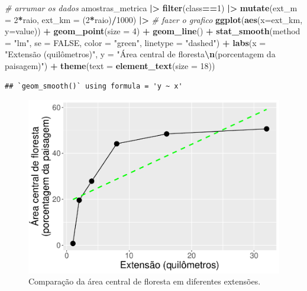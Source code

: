 \documentclass[
]{article}
\newenvironment{Shaded}{\begin{snugshade}}{\end{snugshade}}
\newcommand{\AttributeTok}[1]{\textcolor[rgb]{0.13,0.29,0.53}{#1}}
\newcommand{\CommentTok}[1]{\textcolor[rgb]{0.56,0.35,0.01}{\textit{#1}}}
\newcommand{\ConstantTok}[1]{\textcolor[rgb]{0.56,0.35,0.01}{#1}}
\newcommand{\DecValTok}[1]{\textcolor[rgb]{0.00,0.00,0.81}{#1}}
\newcommand{\FunctionTok}[1]{\textcolor[rgb]{0.13,0.29,0.53}{\textbf{#1}}}
\newcommand{\NormalTok}[1]{#1}
\newcommand{\SpecialCharTok}[1]{\textcolor[rgb]{0.81,0.36,0.00}{\textbf{#1}}}
\newcommand{\StringTok}[1]{\textcolor[rgb]{0.31,0.60,0.02}{#1}}
\begin{document}
\begin{Shaded}
\begin{Highlighting}[]
\CommentTok{\# arrumar os dados}
\NormalTok{amostras\_metrica }\SpecialCharTok{|\textgreater{}} 
  \FunctionTok{filter}\NormalTok{(class}\SpecialCharTok{==}\DecValTok{1}\NormalTok{) }\SpecialCharTok{|\textgreater{}} 
  \FunctionTok{mutate}\NormalTok{(}\AttributeTok{ext\_m =} \DecValTok{2}\SpecialCharTok{*}\NormalTok{raio, }
         \AttributeTok{ext\_km =}\NormalTok{ (}\DecValTok{2}\SpecialCharTok{*}\NormalTok{raio)}\SpecialCharTok{/}\DecValTok{1000}\NormalTok{) }\SpecialCharTok{|\textgreater{}}
\CommentTok{\# fazer o grafico}
  \FunctionTok{ggplot}\NormalTok{(}\FunctionTok{aes}\NormalTok{(}\AttributeTok{x=}\NormalTok{ext\_km, }\AttributeTok{y=}\NormalTok{value)) }\SpecialCharTok{+} 
  \FunctionTok{geom\_point}\NormalTok{(}\AttributeTok{size =} \DecValTok{4}\NormalTok{) }\SpecialCharTok{+} 
  \FunctionTok{geom\_line}\NormalTok{() }\SpecialCharTok{+}
  \FunctionTok{stat\_smooth}\NormalTok{(}\AttributeTok{method =} \StringTok{"lm"}\NormalTok{, }\AttributeTok{se =} \ConstantTok{FALSE}\NormalTok{, }\AttributeTok{color =} \StringTok{"green"}\NormalTok{, }
              \AttributeTok{linetype =} \StringTok{"dashed"}\NormalTok{) }\SpecialCharTok{+} 
  \FunctionTok{labs}\NormalTok{(}\AttributeTok{x =} \StringTok{"Extensão (quilômetros)"}\NormalTok{, }
       \AttributeTok{y =} \StringTok{"Área central de floresta}\SpecialCharTok{\textbackslash{}n}\StringTok{(porcentagem da paisagem)"}\NormalTok{) }\SpecialCharTok{+} 
  \FunctionTok{theme}\NormalTok{(}\AttributeTok{text =} \FunctionTok{element\_text}\NormalTok{(}\AttributeTok{size =} \DecValTok{18}\NormalTok{)) }
\end{Highlighting}
\end{Shaded}

\begin{verbatim}
## `geom_smooth()` using formula = 'y ~ x'
\end{verbatim}

\begin{figure}

{\centering \includegraphics[width=0.55\linewidth,height=0.55\textheight]{epr_files/figure-latex/unnamed-chunk-37-1} 

}

\caption{Comparação da área central de floresta em diferentes extensões.}\label{fig:unnamed-chunk-37}
\end{figure}
\end{document}

